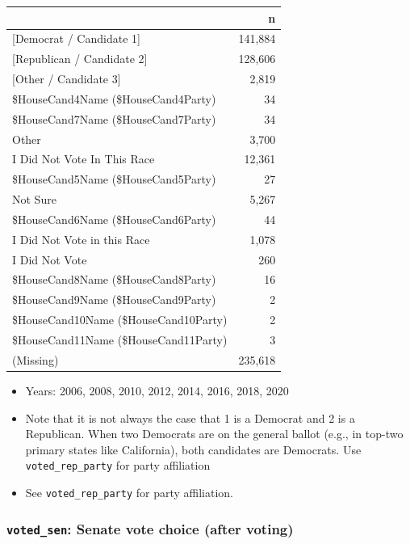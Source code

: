 \documentclass[10pt,article,oneside]{memoir}
\theoremstyle{definition}
\begin{document}
\begin{table}[H]
\centering
\begin{tabular}{lr}
\toprule
 & n\\
\midrule
{[Democrat / Candidate 1]} & 141,884\\
{[Republican / Candidate 2]} & 128,606\\
{[Other / Candidate 3]} & 2,819\\
\$HouseCand4Name (\$HouseCand4Party) & 34\\
\$HouseCand7Name (\$HouseCand7Party) & 34\\
Other & 3,700\\
I Did Not Vote In This Race & 12,361\\
\$HouseCand5Name (\$HouseCand5Party) & 27\\
Not Sure & 5,267\\
\$HouseCand6Name (\$HouseCand6Party) & 44\\
I Did Not Vote in this Race & 1,078\\
I Did Not Vote & 260\\
\$HouseCand8Name (\$HouseCand8Party) & 16\\
\$HouseCand9Name (\$HouseCand9Party) & 2\\
\$HouseCand10Name (\$HouseCand10Party) & 2\\
\$HouseCand11Name (\$HouseCand11Party) & 3\\
(Missing) & 235,618\\
\bottomrule
\end{tabular}
\end{table}

\begin{itemize}
\tightlist
\item
  Years: 2006, 2008, 2010, 2012, 2014, 2016, 2018, 2020
\item
  Note that it is not always the case that 1 is a Democrat and 2 is a
  Republican. When two Democrats are on the general ballot (e.g., in
  top-two primary states like California), both candidates are
  Democrats. Use \texttt{voted\_rep\_party} for party affiliation
\item
  See \texttt{voted\_rep\_party} for party affiliation.
\end{itemize}

\hypertarget{voted_sen-senate-vote-choice-after-voting}{%
\subsubsection{\texorpdfstring{\texttt{voted\_sen}: Senate vote choice
(after
voting)}{voted\_sen: Senate vote choice (after voting)}}\label{voted_sen-senate-vote-choice-after-voting}}
\end{document}
